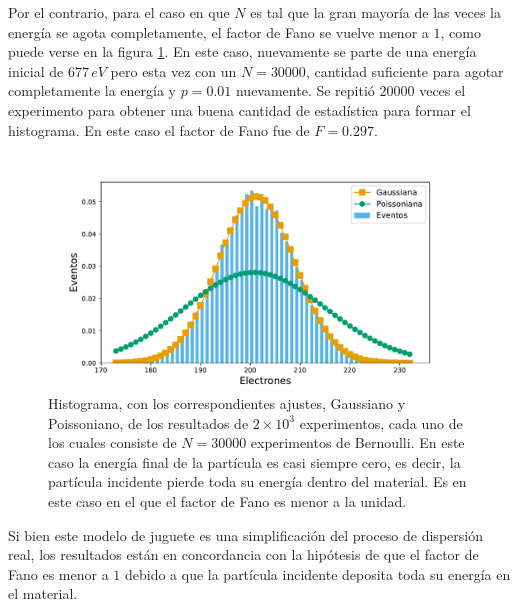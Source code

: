 \indent Por el contrario, para el caso en que $N$ es tal que la gran mayoría de las veces la energía se agota completamente, el factor de Fano se vuelve menor a $1$, como puede verse en la figura \ref{fig:SimulacionOrden0Fano0}. En este caso, nuevamente se parte de una energía inicial de $677\,\si{eV}$ pero esta vez con un $N = 30000$, cantidad suficiente para agotar completamente la energía y $p=0.01$ nuevamente. Se repitió $20000$ veces el experimento para obtener una buena cantidad de estadística para formar el histograma. En este caso el factor de Fano fue de $F = 0.297$.
\begin{figure}%
    \centering
    \includegraphics[scale=0.5]{Figs/Orden0_fano0.pdf}
    \caption{\footnotesize{Histograma, con los correspondientes ajustes, Gaussiano y Poissoniano, de los resultados de $2\times 10^3$ experimentos, cada uno de los cuales consiste de $N = 30000$ experimentos de Bernoulli. En este caso la energía final de la partícula es casi siempre cero, es decir, la partícula incidente pierde toda su energía dentro del material. Es en este caso en el que el factor de Fano es menor a la unidad.}}
    \label{fig:SimulacionOrden0Fano0}
\end{figure}

Si bien este modelo de juguete es una simplificación del proceso de dispersión real, los resultados están en concordancia con la hipótesis de que el factor de Fano es menor a $1$ debido a que la partícula incidente deposita toda su energía en el material.
